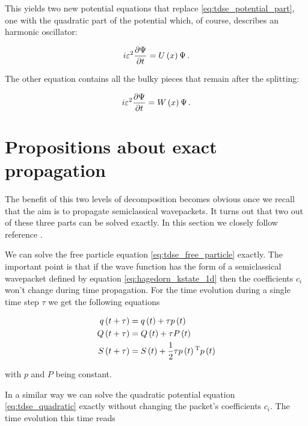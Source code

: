 This yields two new potential equations that replace \eqref{eq:tdse_potential_part},
one with the quadratic part of the potential which, of course, describes an
harmonic oscillator:

\begin{equation} \label{eq:tdse_quadratic}
  i \varepsilon^2 \frac{\partial \Psi}{\partial t} = U\left( x \right) \Psi \,.
\end{equation}

The other equation contains all the bulky pieces that remain after the splitting:

\begin{equation} \label{eq:tdse_remainder}
  i \varepsilon^2 \frac{\partial \Psi}{\partial t} = W\left( x \right) \Psi \,.
\end{equation}

\section{Propositions about exact propagation}

The benefit of this two levels of decomposition becomes obvious once we recall that
the aim is to propagate semiclassical wavepackets. It turns out that two out of
these three parts can be solved exactly. In this section we closely follow reference
\cite{FGL_semiclassical_dynamics}.

We can solve the free particle equation \eqref{eq:tdse_free_particle} exactly.
The important point is that if the wave function has the form of a semiclassical
wavepacket defined by equation \eqref{eq:hagedorn_kstate_1d} then the coefficients
$c_i$ won't change during time propagation. For the time evolution during a single
time step $\tau$ we get the following equations

\begin{equation} \label{eq:splitting_prop_kinetic}
\begin{split}
  q\left( t+\tau \right) & = q\left( t \right) + \tau p\left( t \right) \\
  Q\left( t+\tau \right) & = Q\left( t \right) + \tau P\left( t \right) \\
  S\left( t+\tau \right) & = S\left( t \right) + \frac{1}{2} \tau p\left( t \right){}^{\textnormal{T}} p\left( t \right)
\end{split}
\end{equation}

with $p$ and $P$ being constant.

In a similar way we can solve the quadratic potential equation \eqref{eq:tdse_quadratic}
exactly without changing the packet's coefficients $c_i$. The time evolution this
time reads

